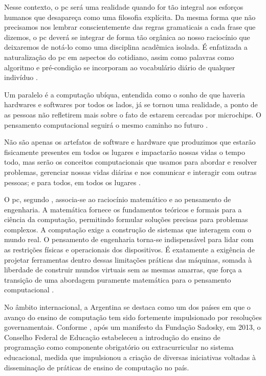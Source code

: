 Nesse contexto, o \gls{pc} será uma realidade quando for tão integral aos
esforços humanos que desapareça como uma filosofia explícita. Da mesma forma
que não precisamos nos lembrar conscientemente das regras gramaticais a cada
frase que dizemos, o \gls{pc} deverá se integrar de forma tão
orgânica ao nosso raciocínio que deixaremos de notá-lo como uma disciplina
acadêmica isolada. É enfatizada a naturalização do \gls{pc} em aspectos do
cotidiano, assim como palavras como algoritmo e pré-condição se incorporam ao
vocabulário diário de qualquer indivíduo \cite{wing2006}.

Um paralelo é a computação ubíqua, entendida como o sonho de que haveria
hardwares e softwares por todos os lados, já se tornou uma realidade, a ponto de
as pessoas não refletirem mais sobre o fato de estarem cercadas por microchips.
O pensamento computacional seguirá o mesmo caminho no futuro \cite{wing2006}.

\begin{citacao}
Não são apenas os artefatos de software e hardware que produzimos que estarão
fisicamente presentes em todos os lugares e impactarão nossas vidas o tempo todo, mas
serão os conceitos computacionais que usamos para abordar e resolver problemas,
gerenciar nossas vidas diárias e nos comunicar e interagir com outras pessoas; e
para todos, em todos os lugares \cite[tradução nossa]{wing2006}.
\end{citacao}

O \gls{pc}, segundo , associa-se ao raciocínio matemático e ao
pensamento de engenharia. A matemática fornece os fundamentos teóricos e formais
para a ciência da computação, permitindo formular soluções precisas para
problemas complexos. A computação exige a construção de sistemas que interagem
com o mundo real. O pensamento de engenharia torna-se indispensável para lidar
com as restrições físicas e operacionais dos dispositivos. É exatamente a
exigência de projetar ferramentas dentro dessas limitações práticas das
máquinas, somada à liberdade de construir mundos virtuais sem as mesmas amarras,
que força a transição de uma abordagem puramente matemática para o pensamento
computacional \cite{wing2006}.

No âmbito internacional, a Argentina se destaca como um dos países em que o
avanço do ensino de computação tem sido fortemente impulsionado por resoluções
governamentais. Conforme , após um manifesto da
Fundação Sadosky, em 2013, o Conselho Federal de Educação estabeleceu a
introdução do ensino de programação como componente obrigatório ou
extracurricular no sistema educacional, medida que impulsionou a criação de
diversas iniciativas voltadas à disseminação de práticas de ensino de computação
no país. 

